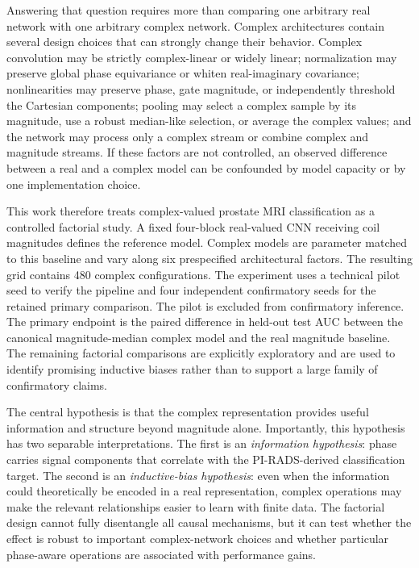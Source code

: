 \documentclass[journal]{IEEEtran}
\begin{document}
Answering that question requires more than comparing one arbitrary real network with one arbitrary complex network. Complex architectures contain several design choices that can strongly change their behavior. Complex convolution may be strictly complex-linear or widely linear; normalization may preserve global phase equivariance or whiten real-imaginary covariance; nonlinearities may preserve phase, gate magnitude, or independently threshold the Cartesian components; pooling may select a complex sample by its magnitude, use a robust median-like selection, or average the complex values; and the network may process only a complex stream or combine complex and magnitude streams. If these factors are not controlled, an observed difference between a real and a complex model can be confounded by model capacity or by one implementation choice.

This work therefore treats complex-valued prostate MRI classification as a controlled factorial study. A fixed four-block real-valued CNN receiving coil magnitudes defines the reference model. Complex models are parameter matched to this baseline and vary along six prespecified architectural factors. The resulting grid contains 480 complex configurations. The experiment uses a technical pilot seed to verify the pipeline and four independent confirmatory seeds for the retained primary comparison. The pilot is excluded from confirmatory inference. The primary endpoint is the paired difference in held-out test \ac{AUC} between the canonical magnitude-median complex model and the real magnitude baseline. The remaining factorial comparisons are explicitly exploratory and are used to identify promising inductive biases rather than to support a large family of confirmatory claims.

The central hypothesis is that the complex representation provides useful information and structure beyond magnitude alone. Importantly, this hypothesis has two separable interpretations. The first is an \emph{information hypothesis}: phase carries signal components that correlate with the PI-RADS-derived classification target. The second is an \emph{inductive-bias hypothesis}: even when the information could theoretically be encoded in a real representation, complex operations may make the relevant relationships easier to learn with finite data. The factorial design cannot fully disentangle all causal mechanisms, but it can test whether the effect is robust to important complex-network choices and whether particular phase-aware operations are associated with performance gains.
\end{document}
